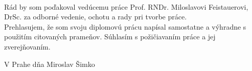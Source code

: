 \normalsize
\setcounter{page}{2}
\ \vspace{10mm} 

\noindent Rád by som poďakoval vedúcemu práce Prof. RNDr. Miloslavovi
Feistauerovi, DrSc. za odborné vedenie, ochotu a rady pri tvorbe práce. \\


\vspace{\fill}
\noindent Prehlasujem, že som svoju diplomovú prácu napísal samostatne a
výhradne s použitím citovaných prameňov. Súhlasím s požičiavaním práce a jej 
zverejňovaním.

\bigskip
\noindent V Prahe dňa \hspace{\fill}Miroslav Šimko

